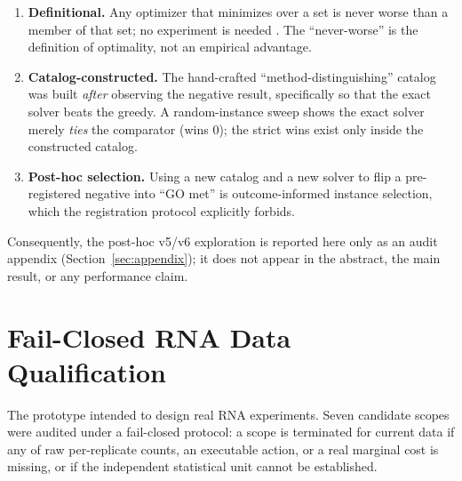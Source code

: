 \documentclass[11pt]{article}
\begin{document}
\begin{enumerate}
  \item \textbf{Definitional.} Any optimizer that minimizes over a set is never worse than a member of that set; no experiment is needed \cite{moret1985minimizing}. The ``never-worse'' is the definition of optimality, not an empirical advantage.
  \item \textbf{Catalog-constructed.} The hand-crafted ``method-distinguishing'' catalog was built \emph{after} observing the negative result, specifically so that the exact solver beats the greedy. A random-instance sweep shows the exact solver merely \emph{ties} the comparator (wins $0$); the strict wins exist only inside the constructed catalog.
  \item \textbf{Post-hoc selection.} Using a new catalog and a new solver to flip a pre-registered negative into ``GO met'' is outcome-informed instance selection, which the registration protocol explicitly forbids.
\end{enumerate}

Consequently, the post-hoc v5/v6 exploration is reported here only as an audit appendix (Section~\ref{sec:appendix}); it does not appear in the abstract, the main result, or any performance claim.

\section{Fail-Closed RNA Data Qualification}\label{sec:data}

The prototype intended to design real RNA experiments. Seven candidate scopes were audited under a fail-closed protocol: a scope is terminated for current data if any of raw per-replicate counts, an executable action, or a real marginal cost is missing, or if the independent statistical unit cannot be established.
\end{document}
